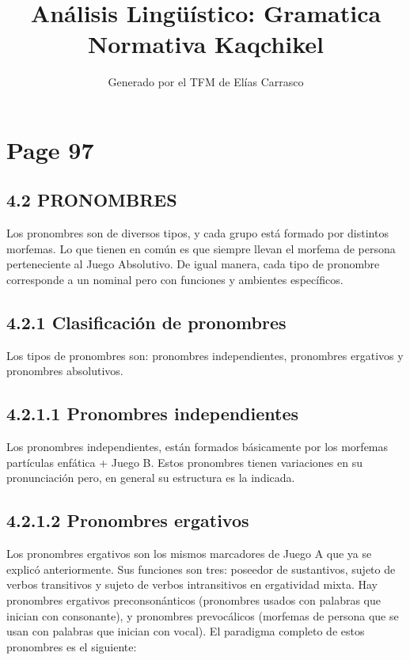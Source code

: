 \documentclass{article}%
\title{Análisis Lingüístico: Gramatica Normativa Kaqchikel}%
\author{Generado por el TFM de Elías Carrasco}%
\begin{document}
%
\normalsize%
\maketitle%
\section{Page 97}%
\label{sec:Page97}%
\subsection{4.2 PRONOMBRES}%
\label{subsec:4.2PRONOMBRES}%

%
Los pronombres son de diversos tipos, y cada grupo está formado por distintos %
morfemas. Lo que tienen en común es que siempre llevan el morfema de persona %
perteneciente al Juego Absolutivo. De igual manera, cada tipo de pronombre corresponde %
a un nominal pero con funciones y ambientes específicos. %
\subsection{4.2.1 Clasificación de pronombres}%
\label{subsec:4.2.1Clasificacindepronombres}%

%
Los tipos de pronombres son: pronombres independientes, pronombres ergativos y %
pronombres absolutivos. %
\subsection{4.2.1.1 Pronombres independientes}%
\label{subsec:4.2.1.1Pronombresindependientes}%

%
Los pronombres independientes, están formados básicamente por los morfemas %
partículas enfática + Juego B. Estos pronombres tienen variaciones en su %
pronunciación pero, en general su estructura es la indicada. %
\subsection{4.2.1.2 Pronombres ergativos}%
\label{subsec:4.2.1.2Pronombresergativos}%

%
Los pronombres ergativos son los mismos marcadores de Juego A que ya se %
explicó anteriormente. Sus funciones son tres: poseedor de sustantivos, sujeto de %
verbos transitivos y sujeto de verbos intransitivos en ergatividad mixta. Hay %
pronombres ergativos preconsonánticos (pronombres usados con palabras que inician %
con consonante), y pronombres prevocálicos (morfemas de persona que se usan con %
palabras que inician con vocal). El paradigma completo de estos pronombres es el %
siguiente: 

%
\end{document}
